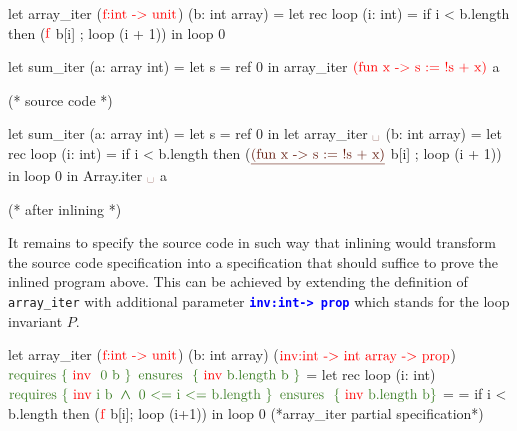 \documentclass[a4paper,11pt,oneside]{article}
\theoremstyle{plain}
\newcommand{\bwedge}{\boldsymbol{~\wedge~}}
\begin{document}
\begin{adjustwidth}{-1em}{-2em}
\begin{footnotesize}
\begin{minipage}[t]{0.3\linewidth}
	\begin{whycode}  
   let array_iter ($\textcolor{red}{\text{f:int -> unit}}$) (b: int array)   
   = let rec loop (i: int) =  
       if i < b.length 
       then ($\textcolor{red}{\text{f}}$ b[i] ; loop (i + 1)) 
     in loop 0
   
   let sum_iter (a: array int) =		 
     let s = ref 0 in
     array\_iter $\textcolor{red}{\text{(fun x -> s := !s + x)}}$ a  
     
  (* source code *)   
 	\end{whycode}
 	\end{minipage}\hfill\vline
 \begin{minipage}[t]{0.45\linewidth} 

	\begin{whycode}  
   let sum_iter (a: array int) =		
     let s = ref 0 in
     let array_iter $\textcolor{Sepia}{\text{\textvisiblespace}}$ (b: int array)   
     = let rec loop (i: int) =  
         if i < b.length then
         ($\textcolor{Sepia}{\text{\underline{(fun x -> s := !s + x)}}}$ b[i] ; 
         loop (i + 1)) 
       in loop 0   
     in Array.iter $\textcolor{Sepia}{\text{\textvisiblespace}}$ a   
     
    (* after inlining *)
 	\end{whycode}
 	\end{minipage}
 \end{footnotesize}
\end{adjustwidth}

It remains to specify the source code in such way that inlining would transform the source code specification into a specification that should suffice to prove the inlined program above. 
This can be achieved by extending the definition of \texttt{array\_iter} with additional parameter \textcolor{blue}{\texttt{\textbf{inv:int-> prop}}} which stands for the loop invariant $P$. 
\begin{small}
\begin{whycode}  
   let array_iter ($\textcolor{red}{\text{f:int -> unit}}$) (b: int array) ($\textcolor{red}{\text{inv:int -> int array -> prop}}$)    
     $\textcolor{OliveGreen}{\text{requires \{ \textcolor{red}{\text{inv }} 0~b \}}}$
     $\textcolor{OliveGreen}{\text{ensures~~}\{ \text{ \textcolor{red}{inv} b.length~b }\}}$  
   = let rec loop (i: int)
       $\textcolor{OliveGreen}{ \text{requires \{~\textcolor{red}{inv} i b} \bwedge \text{0 <= i <= b.length}~\}}$
       $\textcolor{OliveGreen}{\text{ensures~~}\{ \text{ \textcolor{red}{inv} b.length~b}\}}$ =    
       = if i < b.length then ($\textcolor{red}{\text{f}}$ b[i]; loop (i+1)) 
     in loop 0       
                                          (*array_iter partial specification*)
\end{whycode}
\end{small}
\end{document}
